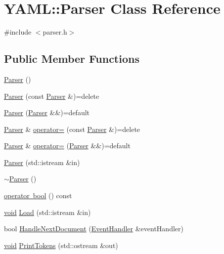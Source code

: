 \hypertarget{class_y_a_m_l_1_1_parser}{}\section{Y\+A\+ML\+::Parser Class Reference}
\label{class_y_a_m_l_1_1_parser}


{\ttfamily \#include $<$parser.\+h$>$}

\subsection*{Public Member Functions}
\begin{DoxyCompactItemize}
\item 
\mbox{\hyperlink{class_y_a_m_l_1_1_parser_a0e70f6d93a2179bfeb0f46a8fa29c2e4}{Parser}} ()
\item 
\mbox{\hyperlink{class_y_a_m_l_1_1_parser_ae50ae1f48cf0eaa1c0f661a1e7e342e1}{Parser}} (const \mbox{\hyperlink{class_y_a_m_l_1_1_parser}{Parser}} \&)=delete
\item 
\mbox{\hyperlink{class_y_a_m_l_1_1_parser_a49484a840b41e33f667cf1a8b38d14f9}{Parser}} (\mbox{\hyperlink{class_y_a_m_l_1_1_parser}{Parser}} \&\&)=default
\item 
\mbox{\hyperlink{class_y_a_m_l_1_1_parser}{Parser}} \& \mbox{\hyperlink{class_y_a_m_l_1_1_parser_abcfdbdd14d7847a960e82bb3cfe682e7}{operator=}} (const \mbox{\hyperlink{class_y_a_m_l_1_1_parser}{Parser}} \&)=delete
\item 
\mbox{\hyperlink{class_y_a_m_l_1_1_parser}{Parser}} \& \mbox{\hyperlink{class_y_a_m_l_1_1_parser_a2af7e07c9e09cb4a9e79708f39d5d901}{operator=}} (\mbox{\hyperlink{class_y_a_m_l_1_1_parser}{Parser}} \&\&)=default
\item 
\mbox{\hyperlink{class_y_a_m_l_1_1_parser_a48fa032c51c491baa16738c4340b20e8}{Parser}} (std\+::istream \&in)
\item 
\mbox{\hyperlink{class_y_a_m_l_1_1_parser_ab901da63c58009ce94635dd6150e574f}{$\sim$\+Parser}} ()
\item 
\mbox{\hyperlink{class_y_a_m_l_1_1_parser_a292eda06e37bf6460d421460341e9c47}{operator bool}} () const
\item 
\mbox{\hyperlink{glad_8h_a950fc91edb4504f62f1c577bf4727c29}{void}} \mbox{\hyperlink{class_y_a_m_l_1_1_parser_aa988a8bbe094e6c6c6a9d18b38d5d880}{Load}} (std\+::istream \&in)
\item 
bool \mbox{\hyperlink{class_y_a_m_l_1_1_parser_ab5c33d17f902e0e7a50d5212ba46f6bf}{Handle\+Next\+Document}} (\mbox{\hyperlink{class_y_a_m_l_1_1_event_handler}{Event\+Handler}} \&event\+Handler)
\item 
\mbox{\hyperlink{glad_8h_a950fc91edb4504f62f1c577bf4727c29}{void}} \mbox{\hyperlink{class_y_a_m_l_1_1_parser_abca395895c919ccbd15fb042858f8ae5}{Print\+Tokens}} (std\+::ostream \&out)
\end{DoxyCompactItemize}


